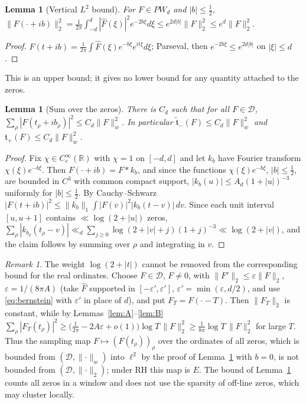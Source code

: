 \documentclass[11pt]{amsart}
\newtheorem{lemma}[theorem]{Lemma}
\theoremstyle{definition}
\theoremstyle{remark}
\newtheorem{remark}[theorem]{Remark}
\newcommand{\half}{\tfrac12}
\newcommand{\PW}{\mathit{PW}_d}
\newcommand{\tplus}{\mathfrak t_+}
\newcommand{\ttilde}{\widetilde{\mathfrak t}_-}
\newcommand{\Norm}[1]{\lVert #1 \rVert}
\begin{document}
\begin{lemma}[Vertical $L^{2}$ bound]\label{lem:C}
For $F\in\PW$ and $|b|\le\half$,
$\Norm{F(\cdot+ib)}_2^{2}=\tfrac1{2\pi}\int_{-d}^{d}|\widehat F(\xi)|^{2}e^{-2b\xi}d\xi\le
e^{2d|b|}\Norm{F}_2^{2}\le e^{d}\Norm{F}_2^{2}.$
\end{lemma}
\begin{proof}
$F(t+ib)=\tfrac1{2\pi}\int\widehat F(\xi)e^{-b\xi}e^{it\xi}d\xi$; Parseval, then
$e^{-2b\xi}\le e^{2d|b|}$ on $|\xi|\le d$.
\end{proof}
This is an upper bound; it gives no lower bound for any quantity attached to the zeros.

\begin{lemma}[Sum over the zeros]\label{lem:D}
There is $C_d$ such that for all $F\in\mathcal D$,
$\sum_{\rho}|F(t_\rho+ib_\rho)|^{2}\le C_d\Norm{F}_w^{2}$. In particular
$\ttilde(F)\le C_d\Norm{F}_w^{2}$ and $\tplus(F)\le C_d\Norm{F}_w^{2}$.
\end{lemma}
\begin{proof}
Fix $\chi\in C_c^\infty(\mathbb R)$ with $\chi=1$ on $[-d,d]$ and let $k_b$ have Fourier
transform $\chi(\xi)e^{-b\xi}$. Then $F(\cdot+ib)=F*k_b$, and since the functions
$\chi(\xi)e^{-b\xi}$, $|b|\le\half$, are bounded in $C^{3}$ with common compact support,
$|k_b(u)|\le A_d(1+|u|)^{-3}$ uniformly for $|b|\le\half$. By Cauchy--Schwarz
$|F(t+ib)|^{2}\le\Norm{k_b}_1\int|F(v)|^{2}|k_b(t-v)|\,dv$. Since each unit interval
$[u,u+1]$ contains $\ll\log(2+|u|)$ zeros,
$\sum_\rho|k_{b_\rho}(t_\rho-v)|\ll_d\sum_{j\ge0}\log(2+|v|+j)(1+j)^{-3}\ll\log(2+|v|)$,
and the claim follows by summing over $\rho$ and integrating in $v$.
\end{proof}

\begin{remark}
The weight $\log(2+|t|)$ cannot be removed from the corresponding bound for the
real ordinates. Choose $F\in\mathcal D$, $F\ne0$, with
$\Norm{F'}_2\le\varepsilon\Norm{F}_2$, $\varepsilon=1/(8\pi A)$ (take $\widehat F$ supported
in $[-\varepsilon',\varepsilon']$, $\varepsilon'=\min(\varepsilon,d/2)$, and use
\eqref{eq:bernstein} with $\varepsilon'$ in place of $d$), and put $F_T=F(\cdot-T)$. Then
$\Norm{F_T}_2$ is constant, while by Lemmas~\ref{lem:A}--\ref{lem:B}
$\sum_\rho|F_T(t_\rho)|^{2}\ge\big(\tfrac1{2\pi}-2A\varepsilon+o(1)\big)\log T\,\Norm{F}_2^{2}
\ge\tfrac1{8\pi}\log T\,\Norm{F}_2^{2}$ for large $T$. Thus the sampling map
$F\mapsto(F(t_\rho))_\rho$ over the ordinates of all zeros, which is bounded from
$(\mathcal D,\Norm{\cdot}_w)$ into $\ell^{2}$ by the proof of Lemma~\ref{lem:D} with
$b=0$, is not bounded from $(\mathcal D,\Norm{\cdot}_2)$; under RH this map is $E$. The bound of Lemma~\ref{lem:D} counts all zeros in a window and does not use
the sparsity of off-line zeros, which may cluster locally.
\end{remark}
\end{document}
